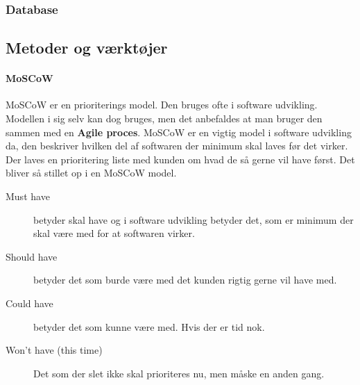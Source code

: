 \subsubsection{Database}

\subsection{Metoder og værktøjer}

\paragraph{MoSCoW} %
MoSCoW er en prioriterings model. Den bruges ofte i software udvikling.\\

\noindent
Modellen i sig selv kan dog bruges, men det anbefaldes at man bruger den sammen med en \textbf{Agile proces}. 
MoSCoW er en vigtig model i software udvikling da, den beskriver hvilken del af softwaren der minimum skal laves før det virker. Der laves en prioritering liste med kunden om hvad de så gerne vil have først. Det bliver så stillet op i en MoSCoW model.

\begin{description}
    \item [Must have] betyder skal have og i software udvikling betyder det, som er minimum der skal være med for at softwaren virker. 
    \item [Should have] betyder det som burde være med det kunden rigtig gerne vil have med.
    \item [Could have] betyder det som kunne være med. Hvis der er tid nok. 
    \item [Won't have (this time)] Det som der slet ikke skal prioriteres nu, men måske en anden gang.
\end{description}